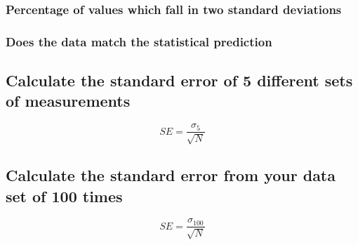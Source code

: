 \documentclass[11pt, letterpaper, includehead]{article}
\begin{document}
\subsubsection{Percentage of values which fall in two standard deviations}

\subsubsection{Does the data match the statistical prediction}

\subsection{Calculate the standard error of 5 different sets of measurements}

$$SE = \frac{\sigma_{5}}{\sqrt{N}}$$


\subsection{Calculate the standard error from your data set of 100 times}


$$SE = \frac{\sigma_{100}}{\sqrt{N}}$$
\end{document}

